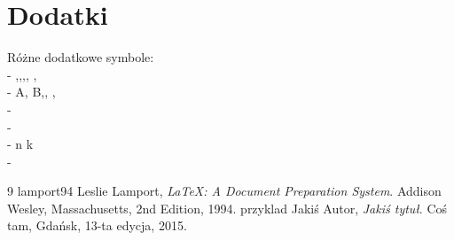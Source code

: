 \documentclass{article}
\begin{document}
\section{Dodatki}\label{sec:dodatki}
Różne dodatkowe symbole: \\
-  \alpha,\beta,\gamma,\delta, \phi, \omega \\
-  A, B,\Gamma, \Delta, \Omega \\
-  \pm \\
-  \infty \\
-  {n \choose k}\ \\
- \Updownarrow






\begin{thebibliography}
{9}
\bibitem
{lamport94}
Leslie Lamport,
\emph{\LaTeX: A Document Preparation System}.
Addison Wesley, Massachusetts,
2nd Edition,
1994.
\bibitem
{przyklad}
Jakiś Autor,
\emph{Jakiś tytuł}.
Coś tam, Gdańsk,
13-ta edycja,
2015.
\end{thebibliography}
\end{document}
